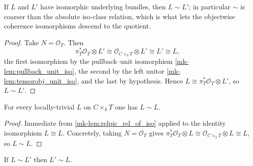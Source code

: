 \begin{lemma}\label{mk-lem:relpic_rel_of_iso}
  \leanok

  If \(L\) and \(L'\) have isomorphic underlying bundles, then \(L \sim L'\); in
  particular \(\sim\) is coarser than the absolute iso-class relation, which is
  what lets the objectwise coherence isomorphisms descend to the quotient.
\end{lemma}

\begin{proof}
  \leanok
  Take \(N = \mathcal{O}_T\). Then
  \[
    \pi_T^* \mathcal{O}_T \otimes L'
      \cong \mathcal{O}_{C \times_k T} \otimes L'
      \cong L' \cong L ,
  \]
  the first isomorphism by the pullback--unit isomorphism
  \ref{mk-lem:pullback_unit_iso}, the second by the left unitor
  \ref{mk-lem:tensorobj_unit_iso}, and the last by hypothesis. Hence
  \(L \cong \pi_T^* \mathcal{O}_T \otimes L'\), so \(L \sim L'\).
\end{proof}

\begin{lemma}\label{mk-lem:relpic_setoid_refl}
  \leanok

  For every locally-trivial \(L\) on \(C \times_k T\) one has \(L \sim L\).
\end{lemma}

\begin{proof}
  \leanok
  Immediate from \ref{mk-lem:relpic_rel_of_iso} applied to the identity
  isomorphism \(L \cong L\). Concretely, taking \(N = \mathcal{O}_T\) gives
  \(\pi_T^* \mathcal{O}_T \otimes L \cong \mathcal{O}_{C \times_k T} \otimes L
  \cong L\), so \(L \sim L\).
\end{proof}

\begin{lemma}\label{mk-lem:relpic_setoid_symm}
  \leanok

  If \(L \sim L'\) then \(L' \sim L\).
\end{lemma}

